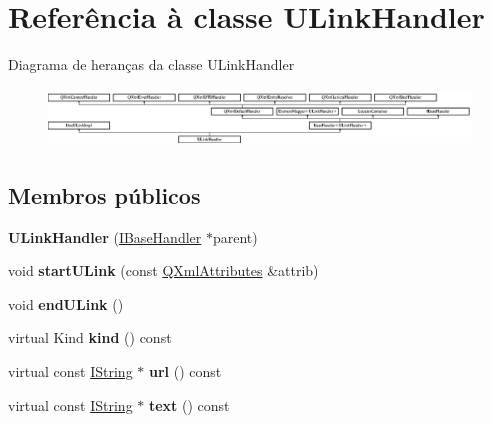 \hypertarget{class_u_link_handler}{\section{Referência à classe U\-Link\-Handler}
\label{class_u_link_handler}
}
Diagrama de heranças da classe U\-Link\-Handler\begin{figure}[H]
\begin{center}
\leavevmode
\includegraphics[height=1.538461cm]{class_u_link_handler}
\end{center}
\end{figure}
\subsection*{Membros públicos}
\begin{DoxyCompactItemize}
\item 
\hypertarget{class_u_link_handler_a623c463d29c5e3bffd9f13d46bbaaa68}{{\bfseries U\-Link\-Handler} (\hyperlink{class_i_base_handler}{I\-Base\-Handler} $\ast$parent)}\label{class_u_link_handler_a623c463d29c5e3bffd9f13d46bbaaa68}

\item 
\hypertarget{class_u_link_handler_a55c1d3b6592e7b365030535c2d558e42}{void {\bfseries start\-U\-Link} (const \hyperlink{class_q_xml_attributes}{Q\-Xml\-Attributes} \&attrib)}\label{class_u_link_handler_a55c1d3b6592e7b365030535c2d558e42}

\item 
\hypertarget{class_u_link_handler_a4794444448ac13449c70d936ef80cf67}{void {\bfseries end\-U\-Link} ()}\label{class_u_link_handler_a4794444448ac13449c70d936ef80cf67}

\item 
\hypertarget{class_u_link_handler_af8e62c8a81ddf2283205cc8955de50eb}{virtual Kind {\bfseries kind} () const }\label{class_u_link_handler_af8e62c8a81ddf2283205cc8955de50eb}

\item 
\hypertarget{class_u_link_handler_ae188b540c3a81d73f080b212cd781f0e}{virtual const \hyperlink{class_i_string}{I\-String} $\ast$ {\bfseries url} () const }\label{class_u_link_handler_ae188b540c3a81d73f080b212cd781f0e}

\item 
\hypertarget{class_u_link_handler_a38ed11cab67ca9bf8d04302e53b86a69}{virtual const \hyperlink{class_i_string}{I\-String} $\ast$ {\bfseries text} () const }\label{class_u_link_handler_a38ed11cab67ca9bf8d04302e53b86a69}

\end{DoxyCompactItemize}
